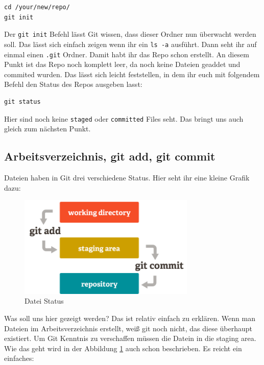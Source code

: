 \documentclass[a4paper,11pt]{scrartcl}	%
\begin{document}
		\begin{lstlisting}[frame=single]
cd /your/new/repo/
git init
		\end{lstlisting}

	Der \texttt{git init} Befehl lässt Git wissen, dass dieser Ordner nun überwacht werden soll. Das lässt sich einfach 
	zeigen wenn ihr ein \texttt{ls -a} ausführt. Dann seht ihr auf einmal einen \texttt{.git} Ordner.
	Damit habt ihr das Repo schon erstellt. An diesem Punkt ist das Repo noch komplett leer, da noch keine Dateien
	geaddet und commited wurden. Das lässt sich leicht feststellen, in dem ihr euch mit folgendem Befehl den Status des
	Repos ausgeben lasst:

		\begin{lstlisting}
git status
		\end{lstlisting}

	Hier sind noch keine \texttt{staged} oder \texttt{committed} Files seht. Das bringt uns auch gleich zum nächsten Punkt.

	\subsection{Arbeitsverzeichnis, git add, git commit}
	Dateien haben in Git drei verschiedene Status. Hier seht ihr eine kleine Grafik dazu:

		\begin{figure}[H]
			\centering
			\includegraphics[width=0.75\textwidth]{img/file-status.png}
			\caption{Datei Status}
			\label{img:FileState}
		\end{figure}

	Was soll uns hier gezeigt werden? Das ist relativ einfach zu erklären. Wenn man Dateien im Arbeitsverzeichnis erstellt,
	weiß git noch nicht, das diese überhaupt existiert. Um Git Kenntnis zu verschaffen müssen die Datein in die \glqq 
	staging area\grqq. Wie das geht wird in der Abbildung \ref{img:FileState} auch schon beschrieben.
	Es reicht ein einfaches:
	
\end{document}
